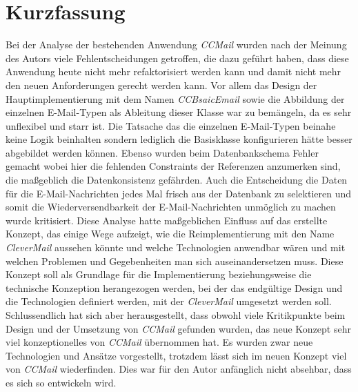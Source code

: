 \chapter{Kurzfassung}
Bei der Analyse der bestehenden Anwendung \emph{CCMail} wurden nach der Meinung des Autors viele Fehlentscheidungen getroffen, die dazu geführt haben, dass diese Anwendung heute nicht mehr refaktorisiert werden kann und damit nicht mehr den neuen Anforderungen gerecht werden kann. Vor allem das Design der Hauptimplementierung mit dem Namen \emph{CCBsaicEmail} sowie die Abbildung der einzelnen E-Mail-Typen als Ableitung dieser Klasse  war zu bemängeln, da es sehr unflexibel und starr ist. Die Tatsache das die einzelnen E-Mail-Typen beinahe keine Logik beinhalten sondern lediglich die Basisklasse konfigurieren hätte besser abgebildet werden können. Ebenso wurden beim Datenbankschema Fehler gemacht wobei hier die fehlenden Constraints der Referenzen anzumerken sind, die maßgeblich die Datenkonsistenz gefährden. Auch die Entscheidung die Daten für die E-Mail-Nachrichten jedes Mal frisch aus der Datenbank zu selektieren und somit die Wiederversendbarkeit der E-Mail-Nachrichten unmöglich zu machen wurde kritisiert.
\newline
\newline
Diese Analyse hatte maßgeblichen Einfluss auf das erstellte Konzept, das einige Wege aufzeigt, wie die Reimplementierung mit den Name \emph{CleverMail} aussehen könnte und welche Technologien anwendbar wären und mit welchen Problemen und Gegebenheiten man sich auseinandersetzen muss. Diese Konzept soll als Grundlage für die Implementierung beziehungsweise die technische Konzeption herangezogen werden, bei der das endgültige Design und die Technologien definiert werden, mit der \emph{CleverMail} umgesetzt werden soll. Schlussendlich hat sich aber herausgestellt, dass obwohl viele Kritikpunkte beim Design und der Umsetzung von \emph{CCMail} gefunden wurden, das neue Konzept sehr viel konzeptionelles von \emph{CCMail} übernommen hat. Es wurden zwar neue Technologien und Ansätze vorgestellt, trotzdem lässt sich im neuen Konzept viel von \emph{CCMail} wiederfinden. Dies war für den Autor anfänglich nicht absehbar, dass es sich so entwickeln wird. 